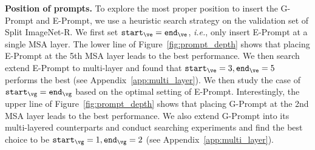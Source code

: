 \documentclass[runningheads]{llncs}
\newcommand{\zifeng}[1]{\textcolor{red}{Zifeng: #1}}
\newcommand{\gprompt}{G-Prompt\xspace}
\newcommand{\eprompt}{E-Prompt\xspace}
\newcommand{\ie}{\emph{i.e.}\xspace}
\def \iep{\texttt{start}_{\ve}}
\def \jep{\texttt{end}_{\ve}}
\def \igp{\texttt{start}_{\vg}}
\def \jgp{\texttt{end}_{\vg}}
\begin{document}


\noindent
\textbf{Position of prompts.}
To explore the most proper position to insert the \gprompt and \eprompt, we use a heuristic search strategy on the validation set of Split ImageNet-R. We first set $\iep = \jep$, \ie, only insert \eprompt at a single MSA layer. The lower line of Figure~\ref{fig:prompt_depth} shows that placing \eprompt at the 5th MSA layer leads to the best performance. We then search extend \eprompt to multi-layer and found that $\iep = 3, \jep = 5$ performs the best (see Appendix~\ref{app:multi_layer}).
We then study the case of $\igp = \jgp$ based on the optimal setting of \eprompt. Interestingly, the upper line of Figure~\ref{fig:prompt_depth} shows that placing \gprompt at the 2nd MSA layer leads to the best performance. We also extend \gprompt into its multi-layered counterparts and conduct searching experiments and find the best choice to be $\igp = 1, \jgp = 2$ (see Appendix~\ref{app:multi_layer}).
\end{document}
